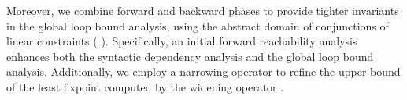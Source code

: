 

Moreover, we combine forward and backward phases to provide tighter invariants in the global loop bound analysis, using the abstract domain of conjunctions of linear constraints (\cf{} ).
Specifically, an initial forward reachability analysis enhances both the syntactic dependency analysis and the global loop bound analysis.
Additionally, we employ a narrowing operator to refine the upper bound of the least fixpoint computed by the widening operator .



